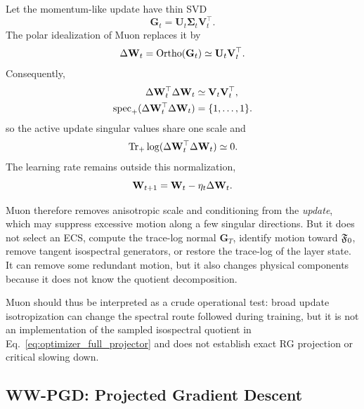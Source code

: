 Let the momentum-like update have thin SVD
\begin{equation}
  \mathbf G_t
  =
  \mathbf U_t\boldsymbol\Sigma_t\mathbf V_t^{\top}.
  \label{eq:muon_update_svd}
\end{equation}
The polar idealization of Muon replaces it by
\begin{equation}
  \Delta\mathbf W_t
  =
  \operatorname{Ortho}(\mathbf G_t)
  \simeq
  \mathbf U_t\mathbf V_t^{\top}.
  \label{eq:muon_polar_update}
\end{equation}
Consequently,
\begin{equation}
\begin{aligned}
  \Delta\mathbf W_t^{\top}\Delta\mathbf W_t
  &\simeq
  \mathbf V_t\mathbf V_t^{\top},\\
  \operatorname{spec}_{+}
  (\Delta\mathbf W_t^{\top}\Delta\mathbf W_t)
  &=\{1,\ldots,1\}.
\end{aligned}
  \label{eq:muon_update_covariance}
\end{equation}
so the active update singular values share one scale and
\begin{equation}
  \operatorname{Tr}_{+}\log
  (\Delta\mathbf W_t^{\top}\Delta\mathbf W_t)
  \simeq 0.
  \label{eq:muon_update_trace_log}
\end{equation}
The learning rate remains outside this normalization,
\begin{equation}
  \mathbf W_{t+1}=\mathbf W_t-\eta_t\Delta\mathbf W_t.
  \label{eq:muon_layer_step}
\end{equation}

Muon therefore removes anisotropic scale and conditioning from the \emph{update}, which may suppress excessive motion along a few singular directions.  But it does not select an ECS, compute the trace-log normal $\mathbf G_T$, identify motion toward $\mathfrak F_0$, remove tangent isospectral generators, or restore the trace-log of the layer state.  It can remove some redundant motion, but it also changes physical components because it does not know the quotient decomposition.

Muon should thus be interpreted as a crude operational test: broad update isotropization can change the spectral route followed during training, but it is not an implementation of the sampled isospectral quotient in Eq.~\eqref{eq:optimizer_full_projector} and does not establish exact RG projection or critical slowing down.

\clearpage
\subsection{WW-PGD: Projected Gradient Descent}
\label{sxn:wwpgd_method}

